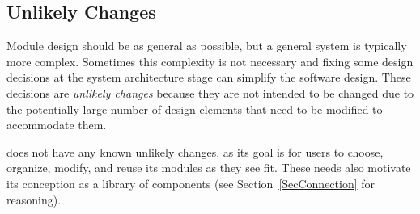 \subsection{Unlikely Changes}\label{SecUchange}
Module design should be as general as possible, but a general system is
typically more complex. Sometimes this complexity is not necessary and fixing
some design decisions at the system architecture stage can simplify the
software design. These decisions are \textit{unlikely changes} because they are
not intended to be changed due to the potentially large number of design
elements that need to be modified to accommodate them.

\progname{} does not have any known unlikely changes, as its goal is for users 
to choose, organize, modify, and reuse its modules as they see fit. These needs 
also motivate its conception as a library of components (see 
Section~\ref{SecConnection} for reasoning).